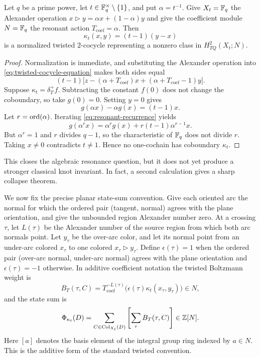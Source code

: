 \begin{theorem}
\label{thm:resonant-affine-class}
Let $q$ be a prime power, let
$t\in\mathbb{F}_q^\times\setminus\{1\}$, and put $\alpha=t^{-1}$.  Give
$X_t=\mathbb{F}_q$ the Alexander operation
$x\triangleright y=\alpha x+(1-\alpha)y$ and give the coefficient module
$N=\mathbb{F}_q$ the resonant action $T_{\mathrm{coef}}=\alpha$.  Then
\begin{equation}
 \kappa_t(x,y)=(t-1)(y-x)
 \label{eq:finite-field-kappa}
\end{equation}
is a normalized twisted $2$-cocycle representing a nonzero class in
$H^2_{TQ}(X_t;N)$.
\end{theorem}

\begin{proof}
Normalization is immediate, and substituting the Alexander operation into
\eqref{eq:twisted-cocycle-equation} makes both sides equal
\[
 (t-1)\bigl[z-(\alpha+T_{\mathrm{coef}})x
 +(\alpha+T_{\mathrm{coef}}-1)y\bigr].
\]
Suppose $\kappa_t=\delta_T^+f$.  Subtracting the constant $f(0)$ does not change
the coboundary, so take $g(0)=0$.  Setting $y=0$ gives
\begin{equation}
 g(\alpha x)-\alpha g(x)=(t-1)x.
 \label{eq:resonant-recurrence}
\end{equation}
Let $r=\operatorname{ord}(\alpha)$.  Iterating \eqref{eq:resonant-recurrence} yields
\[
 g(\alpha^r x)=\alpha^r g(x)+r(t-1)\alpha^{r-1}x.
\]
But $\alpha^r=1$ and $r$ divides $q-1$, so the characteristic of $\mathbb{F}_q$ does not
divide $r$.  Taking $x\ne0$ contradicts $t\ne1$.  Hence no one-cochain has
coboundary $\kappa_t$.
\end{proof}

This closes the algebraic resonance question, but it does not yet produce a
stronger classical knot invariant.  In fact, a second calculation gives a sharp
collapse theorem.

We now fix the precise planar state-sum convention.  Give each oriented arc the
normal for which the ordered pair (tangent, normal) agrees with the plane
orientation, and give the unbounded region Alexander number zero.  At a crossing
$\tau$, let $L(\tau)$ be the Alexander number of the source region from which both
arc normals point.  Let $y_\tau$ be the over-arc color, and let its normal point
from an under-arc colored $x_\tau$ to one colored
$x_\tau\triangleright y_\tau$.  Define $\epsilon(\tau)=1$ when the ordered pair
(over-arc normal, under-arc normal) agrees with the plane orientation and
$\epsilon(\tau)=-1$ otherwise.  In additive coefficient notation the twisted
Boltzmann weight is
\begin{equation}
 B_T(\tau,C)=
 T_{\mathrm{coef}}^{-L(\tau)}
 \bigl(\epsilon(\tau)\kappa_t(x_\tau,y_\tau)\bigr)\in N,
 \label{eq:twisted-boltzmann-weight}
\end{equation}
and the state sum is
\begin{equation}
 \Phi_{\kappa_t}(D)
 =\sum_{C\in\operatorname{Col}_{X_t}(D)}
  \left[\sum_{\tau}B_T(\tau,C)\right]\in\mathbb{Z}[N].
 \label{eq:twisted-state-sum}
\end{equation}
Here $[a]$ denotes the basis element of the integral group ring indexed by
$a\in N$.  This is the additive form of the standard twisted convention.


